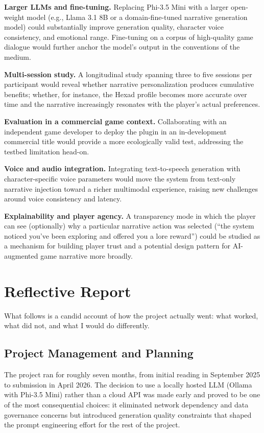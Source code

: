 \textbf{Larger LLMs and fine-tuning.} Replacing Phi-3.5 Mini with a larger open-weight model (e.g., Llama 3.1 8B or a domain-fine-tuned narrative generation model) could substantially improve generation quality, character voice consistency, and emotional range. Fine-tuning on a corpus of high-quality game dialogue would further anchor the model's output in the conventions of the medium.

\textbf{Multi-session study.} A longitudinal study spanning three to five sessions per participant would reveal whether narrative personalization produces cumulative benefits; whether, for instance, the Hexad profile becomes more accurate over time and the narrative increasingly resonates with the player's actual preferences.

\textbf{Evaluation in a commercial game context.} Collaborating with an independent game developer to deploy the plugin in an in-development commercial title would provide a more ecologically valid test, addressing the testbed limitation head-on.

\textbf{Voice and audio integration.} Integrating text-to-speech generation with character-specific voice parameters would move the system from text-only narrative injection toward a richer multimodal experience, raising new challenges around voice consistency and latency.

\textbf{Explainability and player agency.} A transparency mode in which the player can see (optionally) why a particular narrative action was selected (``the system noticed you've been exploring and offered you a lore reward'') could be studied as a mechanism for building player trust and a potential design pattern for AI-augmented game narrative more broadly.

\section{Reflective Report}

What follows is a candid account of how the project actually went: what worked, what did not, and what I would do differently.

\subsection{Project Management and Planning}

The project ran for roughly seven months, from initial reading in September 2025 to submission in April 2026. The decision to use a locally hosted LLM (Ollama with Phi-3.5 Mini) rather than a cloud API was made early and proved to be one of the most consequential choices: it eliminated network dependency and data governance concerns but introduced generation quality constraints that shaped the prompt engineering effort for the rest of the project.


